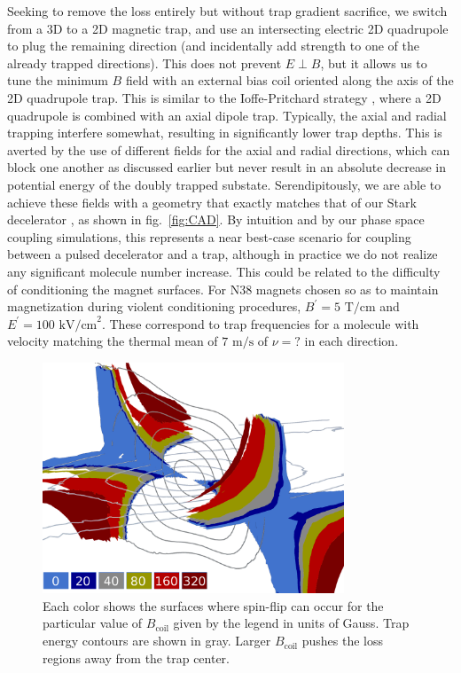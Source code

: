 \documentclass[%
 reprint,
 amsmath,amssymb,
 aps,
prl,
]{revtex4-1}
\begin{document}
Seeking to remove the loss entirely but without trap gradient sacrifice, we switch from a 3D to a 2D magnetic trap, and use an intersecting electric 2D quadrupole to plug the remaining direction (and incidentally add strength to one of the already trapped directions). This does not prevent $E\!\perp\! B$, but it allows us to tune the minimum $B$ field with an external bias coil oriented along the axis of the 2D quadrupole trap. This is similar to the Ioffe-Pritchard strategy \cite{ref:iptrap}, where a 2D quadrupole is combined with an axial dipole trap. Typically, the axial and radial trapping interfere somewhat, resulting in significantly lower trap depths. This is averted by the use of different fields for the axial and radial directions, which can block one another as discussed earlier but never result in an absolute decrease in potential energy of the doubly trapped substate. Serendipitously, we are able to achieve these fields with a geometry that exactly matches that of our Stark decelerator \cite{Bochinski2003}, as shown in fig.~\ref{fig:CAD}. By intuition and by our phase space coupling simulations, this represents a near best-case scenario for coupling between a pulsed decelerator and a trap, although in practice we do not realize any significant molecule number increase. This could be related to the difficulty of conditioning the magnet surfaces. For N38 magnets chosen so as to maintain magnetization during violent conditioning procedures, $B^\prime=5\text{ T/cm}$ and $E^\prime=100 \text{ kV/cm}^2$. These correspond to trap frequencies for a molecule with velocity matching the thermal mean of $7 \text{ m/s}$ of $\nu=?$ in each direction.

\begin{figure}
\includegraphics[width=90mm]{Loss_Surface_Chunks_recolored_legend.png}%
\caption{
Each color shows the surfaces where spin-flip can occur for the particular value of $B_\text{coil}$ given by the legend in units of Gauss. Trap energy contours are shown in gray. Larger $B_\text{coil}$ pushes the loss regions away from the trap center.
\label{fig:LSurfs}}
\end{figure}
\end{document}
